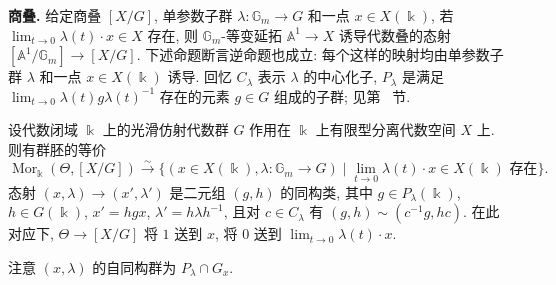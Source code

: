 \textbf{商叠.} 给定商叠 $[X/G]$, 单参数子群 $\lambda:\mathbb G_m\to G$ 和一点 $x\in X(\Bbbk)$, 若 $\lim_{t\to0}\lambda(t)\cdot x\in X$ 存在, 则 $\mathbb G_m$-等变延拓 $\mathbb A^1\to X$ 诱导代数叠的态射 $[\mathbb A^1/\mathbb G_m]\to[X/G]$. 下述命题断言逆命题也成立: 每个这样的映射均由单参数子群 $\lambda$ 和一点 $x\in X(\Bbbk)$ 诱导. 回忆 $C_\lambda$ 表示 $\lambda$ 的中心化子, $P_\lambda$ 是满足 $\lim_{t\to0}\lambda(t)g\lambda(t)^{-1}$ 存在的元素 $g\in G$ 组成的子群; 见第~ 节.
\begin{proposition}\label{src:7.9.1}
设代数闭域 $\Bbbk$ 上的光滑仿射代数群 $G$ 作用在 $\Bbbk$ 上有限型分离代数空间 $X$ 上. 则有群胚的等价
\[\operatorname{Mor}_{\Bbbk}(\Theta,[X/G])\xrightarrow{\sim}
\{(x\in X(\Bbbk),\lambda:\mathbb G_m\to G)\mid\lim_{t\to0}\lambda(t)\cdot x\in X(\Bbbk)\text{ 存在}\}.\]
态射 $(x,\lambda)\to(x',\lambda')$ 是二元组 $(g,h)$ 的同构类, 其中 $g\in P_\lambda(\Bbbk)$, $h\in G(\Bbbk)$, $x'=hgx$, $\lambda'=h\lambda h^{-1}$, 且对 $c\in C_\lambda$ 有 $(g,h)\sim(c^{-1}g,hc)$. 在此对应下, $\Theta\to[X/G]$ 将 $1$ 送到 $x$, 将 $0$ 送到 $\lim_{t\to0}\lambda(t)\cdot x$.
\end{proposition}
\begin{remark}\label{src:7.9.2}
注意 $(x,\lambda)$ 的自同构群为 $P_\lambda\cap G_x$.
\end{remark}
